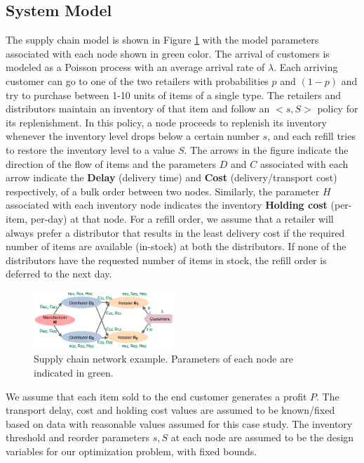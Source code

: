 \subsection{System Model} The supply chain model is shown in Figure \ref{fig:simple_supply_chain_net} with the model parameters associated with each node shown in green color.  The arrival of customers is modeled as a Poisson process with an average arrival rate of $\lambda$.  Each arriving customer can go to one of the two retailers with probabilities $p$ and $(1-p)$ and try to purchase between 1-10 units of items of a single type. The retailers and distributors maintain an inventory of that item and follow an $<s,S>$ policy for its replenishment. In this policy, a node proceeds to replenish its inventory whenever the inventory level drops below a certain number $s$, and each refill tries to restore the inventory level to a value $S$.  The arrows in the figure indicate the direction of the flow of items and the parameters \textbf{$D$} and \textbf{$C$ }associated with each arrow indicate the \textbf{Delay} (delivery time) and \textbf{Cost} (delivery/transport cost)  respectively, of a bulk order between two nodes. Similarly, the parameter $H$ associated with each inventory node indicates the inventory \textbf{Holding cost} (per-item, per-day) at that node. For a refill order, we assume that a retailer will always prefer a distributor that results in the least delivery cost if the required number of items are available (in-stock) at both the distributors. If none of the distributors have the requested number of items in stock, the refill order is deferred to the next day. 
%
\begin{figure}[h]
  \centering
   \includegraphics[width=0.47\textwidth]{image/SupplyChain.pdf}
     \caption{Supply chain network example. Parameters of each node are indicated in green.}
  \label{fig:simple_supply_chain_net}
  \end{figure}
%
 We assume that each item sold to the end customer generates a profit $P$. The transport delay, cost and holding cost values are assumed to be known/fixed based on data with reasonable values assumed for this case study. The inventory threshold and reorder parameters $s,S$ at each node are assumed to be the design variables for our optimization problem, with fixed bounds.

